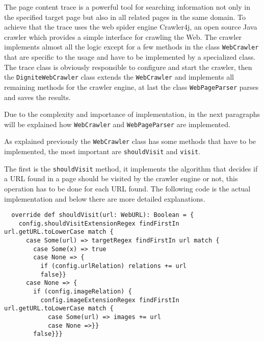 \documentclass[
	a4paper,					10pt,							twoside,					openright,				notitlepage,			parskip=half,			]{scrreprt}
\begin{document}
The page content trace is a powerful tool for searching information not only in the specified target page 
but also in all related pages in the same domain. To achieve that the trace uses the web spider engine
Crawler4j\cite{page:crawler4j}, an open source Java crawler which provides a simple interface for crawling the Web.
The crawler implements almost all the logic except for a few methods in the class \verb|WebCrawler| that are 
specific to the usage and have to be implemented by a specialized class.
The trace class is obviously responsible to configure and start the crawler, then the \verb|DigniteWebCrawler| 
class extends the \verb|WebCrawler| and implements all remaining methods for the crawler engine, at last the class
\verb|WebPageParser| parses and saves the results. 

Due to the complexity and importance of implementation, in the next paragraphs will be explained 
how \verb|WebCrawler| and \verb|WebPageParser| are implemented.

As explained previously the \verb|WebCrawler| class has some methods that have to be implemented, 
the most important are \verb|shouldVisit| and \verb|visit|.

The first is the \verb|shouldVisit| method, it implements the algorithm that decides if a \gls{URL} found 
in a page should be visited by the crawler engine or not, this operation has to be done for each \gls{URL} found. 
The following code is the actual implementation and below there are more detailed explanations.
\begin{lstlisting}
  override def shouldVisit(url: WebURL): Boolean = {
    config.shouldVisitExtensionRegex findFirstIn url.getURL.toLowerCase match {
      case Some(url) => targetRegex findFirstIn url match {
        case Some(x) => true
        case None => {
          if (config.urlRelation) relations += url
          false}}
      case None => {
        if (config.imageRelation) {
          config.imageExtensionRegex findFirstIn url.getURL.toLowerCase match {
            case Some(url) => images += url
            case None =>}}
        false}}}
\end{lstlisting}
\end{document}

